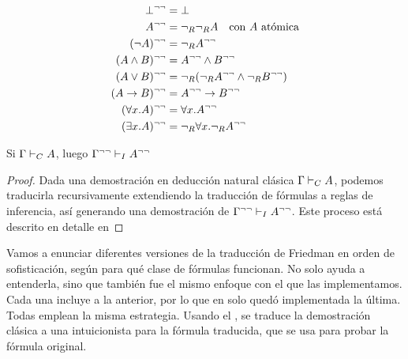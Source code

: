 \begin{definition}
    \begin{align*}
        \bot^{\neg\neg}                         & = \bot                                                             \\
        A^{\neg\neg}                        & = \neg_R\neg_R A
        \quad \text{con $A$ atómica}                                                                              \\
        (\neg A)^{\neg\neg}                & = \neg_R A^{\neg\neg}                                          \\
        (A \wedge B)^{\neg\neg}       & = A^{\neg\neg} \wedge B^{\neg\neg}                     \\
        (A \vee B)^{\neg\neg}        & = \neg_R(\neg_RA^{\neg\neg} \wedge \neg_RB^{\neg\neg}) \\
        (A \rightarrow B)^{\neg\neg} & = A^{\neg\neg} \rightarrow B^{\neg\neg}               \\
        (\forall x . A)^{\neg\neg}          & = \forall x . A^{\neg\neg}                                    \\
        (\exists x . A)^{\neg\neg}          & = \neg_R \forall x . \neg_R A^{\neg\neg}
    \end{align*}
\end{definition}

\begin{theorem}
    \label{fri:thm:dneg-trans-classic-int}
    Si $\Gamma \vdash_C A$, luego $\Gamma^{\neg\neg} \vdash_I A^{\neg\neg}$
\end{theorem}
\begin{proof}
    Dada una demostración en deducción natural clásica $\Gamma \vdash_C A$, podemos traducirla recursivamente extendiendo la traducción de fórmulas a reglas de inferencia, así generando una demostración de $\Gamma^{\neg\neg} \vdash_I A^{\neg\neg}$.
    Este proceso está descrito en detalle en 
\end{proof}

Vamos a enunciar diferentes versiones de la traducción de Friedman en orden de sofisticación, según para qué clase de fórmulas funcionan. No solo ayuda a entenderla, sino que también fue el mismo enfoque con el que las implementamos. Cada una incluye a la anterior, por lo que en \ppaTool{} solo quedó implementada la última. Todas emplean la misma estrategia. Usando el , se traduce la demostración clásica a una intuicionista para la fórmula traducida, que se usa para probar la fórmula original.


